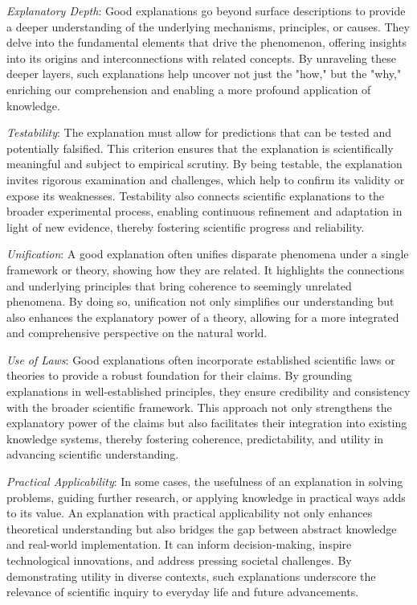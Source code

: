 \emph{Explanatory Depth}: Good explanations go beyond surface descriptions to provide a deeper understanding of the underlying mechanisms, principles, or causes. They delve into the fundamental elements that drive the phenomenon, offering insights into its origins and interconnections with related concepts. By unraveling these deeper layers, such explanations help uncover not just the "how," but the "why," enriching our comprehension and enabling a more profound application of knowledge.

\emph{Testability}: The explanation must allow for predictions that can be tested and potentially falsified. This criterion ensures that the explanation is scientifically meaningful and subject to empirical scrutiny. By being testable, the explanation invites rigorous examination and challenges, which help to confirm its validity or expose its weaknesses. Testability also connects scientific explanations to the broader experimental process, enabling continuous refinement and adaptation in light of new evidence, thereby fostering scientific progress and reliability.

\emph{Unification}: A good explanation often unifies disparate phenomena under a single framework or theory, showing how they are related. It highlights the connections and underlying principles that bring coherence to seemingly unrelated phenomena. By doing so, unification not only simplifies our understanding but also enhances the explanatory power of a theory, allowing for a more integrated and comprehensive perspective on the natural world.

\emph{Use of Laws}: Good explanations often incorporate established scientific laws or theories to provide a robust foundation for their claims. By grounding explanations in well-established principles, they ensure credibility and consistency with the broader scientific framework. This approach not only strengthens the explanatory power of the claims but also facilitates their integration into existing knowledge systems, thereby fostering coherence, predictability, and utility in advancing scientific understanding.

\emph{Practical Applicability}: In some cases, the usefulness of an explanation in solving problems, guiding further research, or applying knowledge in practical ways adds to its value. An explanation with practical applicability not only enhances theoretical understanding but also bridges the gap between abstract knowledge and real-world implementation. It can inform decision-making, inspire technological innovations, and address pressing societal challenges. By demonstrating utility in diverse contexts, such explanations underscore the relevance of scientific inquiry to everyday life and future advancements.

